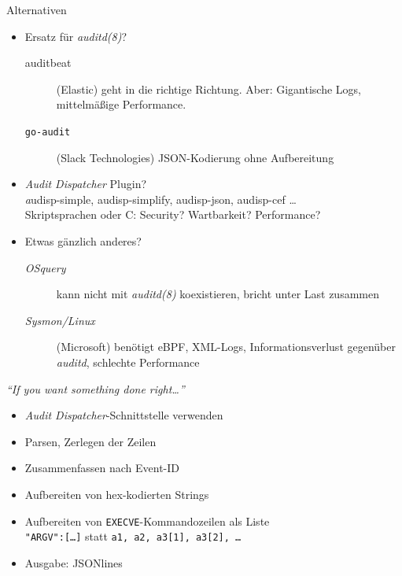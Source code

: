 \documentclass[xcolor={dvipsnames},aspectratio=169]{beamer}
\begin{document}
\begin{frame}{Alternativen}
  \begin{itemize}
  \item Ersatz für \emph{auditd(8)}?
    \begin{description}
    \item[auditbeat] (Elastic) geht in die richtige Richtung.
      Aber: Gigantische Logs, mittelmäßige Performance.
    \item[\texttt{go-audit}] (Slack Technologies) JSON-Kodierung ohne Aufbereitung
    \end{description}
  \item \emph{Audit Dispatcher} Plugin?\\
    {\small\textit audisp-simple, audisp-simplify, audisp-json, audisp-cef \dots}\\
    Skriptsprachen oder C: Security? Wartbarkeit? Performance?
  \item Etwas gänzlich anderes?
    \begin{description}
    \item[\emph{OSquery}] kann nicht mit \emph{auditd(8)} koexistieren, bricht unter Last zusammen
    \item[\emph{Sysmon/Linux}] (Microsoft) benötigt eBPF, XML-Logs,
      Informationsverlust gegenüber \emph{auditd}, schlechte
      Performance 
   \end{description}
  \end{itemize}
\end{frame}

\begin{frame}{\textit{``If you want something done right\dots''}}
  \begin{itemize}
  \item \emph{Audit Dispatcher}-Schnittstelle verwenden
  \item Parsen, Zerlegen der Zeilen
  \item Zusammenfassen nach Event-ID
  \item Aufbereiten von hex-kodierten Strings
  \item Aufbereiten von \texttt{EXECVE}-Kommandozeilen als Liste\\
    {\small{}\texttt{"{}ARGV"{}:[\dots{}]} statt \texttt{a1, a2, a3[1], a3[2], \dots}}
  \item Ausgabe: JSONlines
  \end{itemize}
\end{frame}
\end{document}
